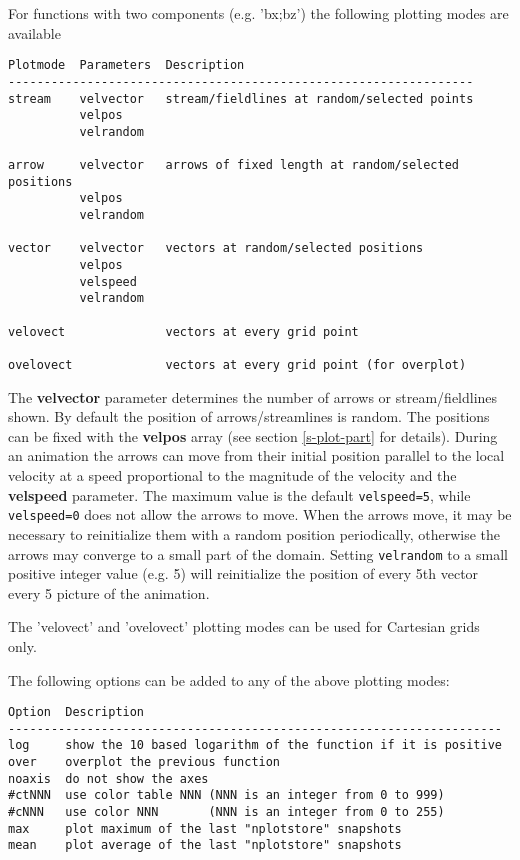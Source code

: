 \documentclass{article}
\begin{document}
For functions with two components (e.g. 'bx;bz') the following plotting
modes are available
\begin{verbatim}
Plotmode  Parameters  Description
-----------------------------------------------------------------
stream    velvector   stream/fieldlines at random/selected points
          velpos  
          velrandom

arrow     velvector   arrows of fixed length at random/selected positions
          velpos
          velrandom

vector    velvector   vectors at random/selected positions
          velpos  
          velspeed
          velrandom

velovect              vectors at every grid point

ovelovect             vectors at every grid point (for overplot)
\end{verbatim}
The {\bf velvector} parameter determines the number of arrows or
stream/fieldlines shown. By default the position of arrows/streamlines
is random. The positions can be fixed with the {\bf velpos} array
(see section \ref{s-plot-part} for details). 
During an animation the arrows can move from their initial position
parallel to the local velocity at a speed proportional to the magnitude
of the velocity and the {\bf velspeed} parameter. The maximum value
is the default {\tt velspeed=5}, while {\tt velspeed=0} does not allow
the arrows to move. When the arrows move, it may be necessary to 
reinitialize them with a random position periodically, otherwise the 
arrows may converge to a small part of the domain. Setting {\tt velrandom}
to a small positive integer value (e.g. 5) will reinitialize the
position of every 5th vector every 5 picture of the animation.

The 'velovect' and 'ovelovect' plotting modes 
can be used for Cartesian grids only.

The following options can be added to any of the above plotting modes:
\begin{verbatim}
Option  Description
---------------------------------------------------------------------
log     show the 10 based logarithm of the function if it is positive
over    overplot the previous function
noaxis  do not show the axes
#ctNNN  use color table NNN (NNN is an integer from 0 to 999)
#cNNN   use color NNN       (NNN is an integer from 0 to 255)
max     plot maximum of the last "nplotstore" snapshots
mean    plot average of the last "nplotstore" snapshots
\end{verbatim}
\end{document}
